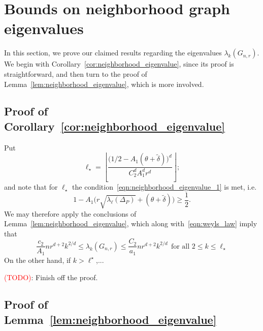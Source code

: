 \documentclass{article}
\newcommand{\floor}[1]{\left\lfloor #1 \right\rfloor}
\newcommand{\1}{\mathbf{1}}
\newcommand{\wt}[1]{\widetilde{#1}}
\theoremstyle{alden}
\theoremstyle{aldenthm}
\theoremstyle{definition}
\theoremstyle{remark}
\begin{document}
\section{Bounds on neighborhood graph eigenvalues}
\label{sec:graph_eigenvalues}
In this section, we prove our claimed results regarding the eigenvalues $\lambda_k(G_{n,r})$. We begin with Corollary~\ref{cor:neighborhood_eigenvalue}, since its proof is straightforward, and then turn to the proof of Lemma~\ref{lem:neighborhood_eigenvalue}, which is more involved.

\subsection{Proof of Corollary~\ref{cor:neighborhood_eigenvalue}}
Put
\begin{equation*}
\ell_{\star} = \floor{\frac{\bigl(1/2 - A_1(\theta + \wt{\delta})\bigr)^d}{C_2^d A_1^d r^d}};
\end{equation*}
and note that for $\ell_{\star}$ the condition~\eqref{eqn:neighborhood_eigenvalue_1} is met, i.e.
\begin{equation*}
1 - A_1\Biggl(r \sqrt{\lambda_{\ell}(\Delta_P)} + (\theta + \wt{\delta})\Biggr)  \geq \frac{1}{2}.
\end{equation*}
We may therefore apply the conclusions of Lemma~\ref{lem:neighborhood_eigenvalue}, which along with~\eqref{eqn:weyls_law} imply that
\begin{equation*}
\frac{c_2}{A_1} nr^{d + 2} k^{2/d} \leq \lambda_k(G_{n,r}) \leq \frac{C_2}{a_1} nr^{d + 2} k^{2/d}~~\textrm{for all $2 \leq k \leq \ell_{\star}$}
\end{equation*}
On the other hand, if $k > \ell^{\star}$,...

\textcolor{red}{(TODO)}: Finish off the proof.

\subsection{Proof of Lemma~\ref{lem:neighborhood_eigenvalue}}
\end{document}
